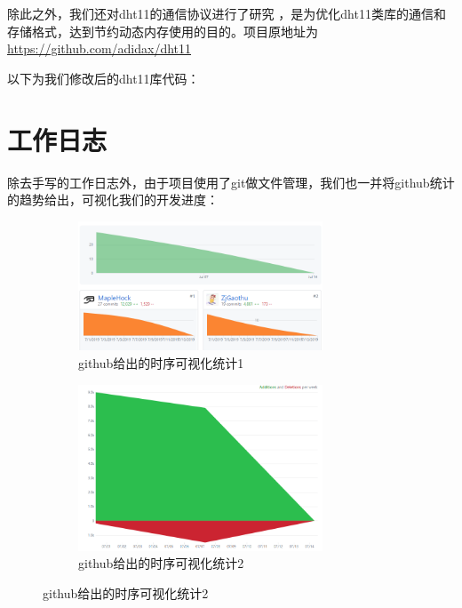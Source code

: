 \documentclass[a4paper, 11pt]{article} %
\begin{document}
除此之外，我们还对dht11的通信协议进行了研究 \cite{dht11}，是为优化dht11类库的通信和存储格式，达到节约动态内存使用的目的。项目原地址为\href{https://github.com/adidax/dht11}{https://github.com/adidax/dht11}



以下为我们修改后的dht11库代码：





\newpage
\section{工作日志}
\label{sec:log}

除去手写的工作日志外，由于项目使用了git做文件管理，我们也一并将github统计的趋势给出，可视化我们的开发进度：

\begin{figure}[H]
  \centering
  \begin{minipage}[H]{0.48\textwidth}
    \begin{figure}[H]
      \centering
      \includegraphics[width = 0.8\textwidth]{git_contributor.jpg}
      \caption{github给出的时序可视化统计1}
    \end{figure}
  \end{minipage}
  \begin{minipage}[H]{0.48\textwidth}
    \begin{figure}[H]
      \centering
      \includegraphics[width = 0.8\textwidth]{git_frequency.jpg}
      \caption{github给出的时序可视化统计2}
    \end{figure}
  \end{minipage}
\end{figure}
\end{document}
